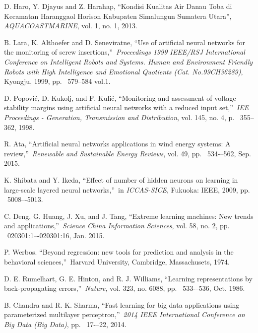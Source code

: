 \documentclass{ws-ijait}
\begin{document}
\begin{thebibliography}{00}

 D.  Haro, Y.  Djayus and Z.  Harahap, \textquotedblleft Kondisi Kualitas Air Danau Toba di Kecamatan Haranggaol Horison Kabupaten Simalungun Sumatera Utara\textquotedblright , {\it AQUACOASTMARINE}, vol. 1, no. 1, 2013.

 B. Lara, K. Althoefer and D. Seneviratne, \textquotedblleft Use of artificial neural networks for the monitoring of screw insertions,\textquotedblright \ {\it Proceedings 1999 IEEE/RSJ International Conference on Intelligent Robots and Systems. Human and Environment Friendly Robots with High Intelligence and Emotional Quotients (Cat. No.99CH36289)}, Kyongju, 1999, pp. ~579--584 vol.1.

 D. Popović, D. Kukolj, and F. Kulić, \textquotedblleft Monitoring and assessment of voltage stability margins using artificial neural networks with a reduced input set,\textquotedblright \ {\it IEE Proceedings - Generation, Transmission and Distribution}, vol. 145, no. 4, p. ~355--362, 1998.

 R. Ata, \textquotedblleft Artificial neural networks applications in wind energy systems: A review,\textquotedblright \ {\it Renewable and Sustainable Energy Reviews}, vol. 49, pp. ~534-–562, Sep. 2015.

 K. Shibata and Y. Ikeda, \textquotedblleft Effect of number of hidden neurons on learning in large-scale layered neural networks,\textquotedblright \ in {\it ICCAS-SICE}, Fukuoka: IEEE, 2009, pp. ~5008–-5013.

 C. Deng, G. Huang, J. Xu, and J. Tang, \textquotedblleft Extreme learning machines: New trends and applications,\textquotedblright \ {\it Science China Information Sciences}, vol. 58, no. 2, pp. ~020301:1–-020301:16, Jan. 2015.

 P. Werbos. \textquotedblleft Beyond regression: new tools for prediction and analysis in the behavioral sciences,\textquotedblright \ Harvard University, Cambridge, Massachusets, 1974.

 D. E. Rumelhart, G. E. Hinton, and R. J. Williams, \textquotedblleft Learning representations by back-propagating errors,\textquotedblright \ {\it Nature}, vol. 323, no. 6088, pp. ~533-–536, Oct. 1986.

 B. Chandra and R. K. Sharma, \textquotedblleft Fast learning for big data applications using parameterized multilayer perceptron,\textquotedblright \ {\it 2014 IEEE International Conference on Big Data (Big Data)}, pp. ~17-–22, 2014.


\end{thebibliography}
\end{document}
